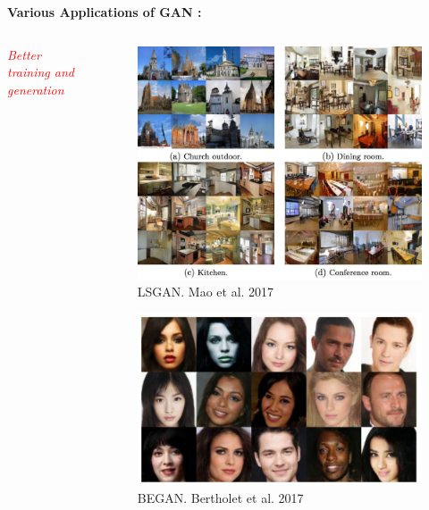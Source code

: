 \begin{frame}
	\textbf{Various Applications of GAN :}
	\vspace*{2mm}
	\begin{columns}
		\hspace*{6mm}\textcolor{red}{\textit{Better training and generation}}
			\begin{overlayarea}{\textwidth}{\textheight}
				\begin{center}
					\begin{figure}[h!]
						\vspace*{-1mm}
						\includegraphics[scale=0.15]{images/lsgan.png}
						\vspace*{-4mm}
						\caption{LSGAN. Mao et al. 2017}
					\end{figure}
					\begin{figure}[h!]
						\vspace*{-4mm}
						\includegraphics[scale=0.15]{images/began.png}
						\vspace*{-4mm}
						\caption{BEGAN. Bertholet et al. 2017}
					\end{figure}
				\end{center}
			\end{overlayarea}
		

\end{columns}
\end{frame}
